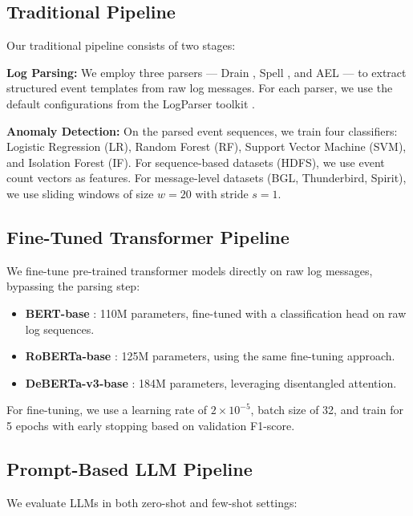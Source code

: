\documentclass[conference]{IEEEtran}
\begin{document}
\subsection{Traditional Pipeline}

Our traditional pipeline consists of two stages:

\textbf{Log Parsing:} We employ three parsers --- Drain \cite{he2017drain}, Spell \cite{du2016spell}, and AEL \cite{jiang2008abstracting} --- to extract structured event templates from raw log messages. For each parser, we use the default configurations from the LogParser toolkit \cite{zhu2019tools}.

\textbf{Anomaly Detection:} On the parsed event sequences, we train four classifiers: Logistic Regression (LR), Random Forest (RF), Support Vector Machine (SVM), and Isolation Forest (IF). For sequence-based datasets (HDFS), we use event count vectors as features. For message-level datasets (BGL, Thunderbird, Spirit), we use sliding windows of size $w=20$ with stride $s=1$.

\subsection{Fine-Tuned Transformer Pipeline}

We fine-tune pre-trained transformer models directly on raw log messages, bypassing the parsing step:

\begin{itemize}
    \item \textbf{BERT-base} \cite{devlin2019bert}: 110M parameters, fine-tuned with a classification head on raw log sequences.
    \item \textbf{RoBERTa-base} \cite{liu2019roberta}: 125M parameters, using the same fine-tuning approach.
    \item \textbf{DeBERTa-v3-base} \cite{he2021deberta}: 184M parameters, leveraging disentangled attention.
\end{itemize}

For fine-tuning, we use a learning rate of $2 \times 10^{-5}$, batch size of 32, and train for 5 epochs with early stopping based on validation F1-score.

\subsection{Prompt-Based LLM Pipeline}

We evaluate LLMs in both zero-shot and few-shot settings:
\end{document}

